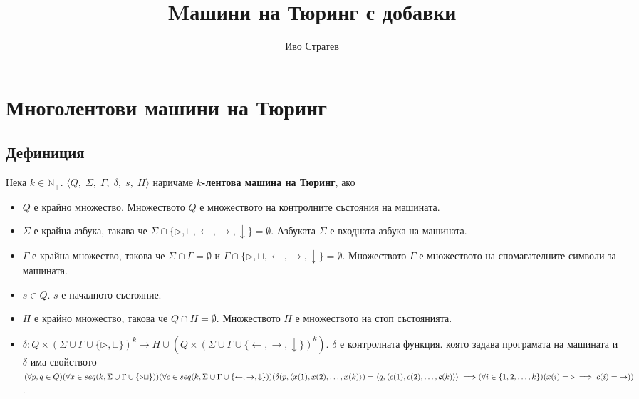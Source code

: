 \documentclass[14pt]{extarticle}
\title{Mашини на Тюринг с добавки}
\author{Иво Стратев}
\begin{document}
\maketitle

\section*{Многолентови машини на Тюринг}

\subsection*{Дефиниция}
Нека \(k \in \mathbb{N}_+\).
\(\langle Q,\; \Sigma,\; \Gamma,\; \delta,\; s,\; H \rangle\) наричаме \textbf{\(k\)-лентова машина на Тюринг}, ако

\begin{itemize}
    \item \(Q\) е крайно множество. Множеството \(Q\) е множеството на контролните състояния на машината.
    \item \(\Sigma\) е крайна азбука, такава че \(\Sigma \cap \{\triangleright, \sqcup, \leftarrow, \rightarrow, \downarrow\} = \emptyset\). Азбуката \(\Sigma\) е входната азбука на машината.
    \item \(\Gamma\) е крайна множество, такова че \(\Sigma \cap \Gamma = \emptyset\) и \(\Gamma \cap \{\triangleright, \sqcup, \leftarrow, \rightarrow, \downarrow\} = \emptyset\). Множеството \(\Gamma\) е множеството на спомагателните символи за машината.
    \item \(s \in Q\). \(s\) е началното състояние.
    \item \(H\) е крайно множество, такова че \(Q \cap H = \emptyset\). Множеството \(H\) е множеството на стоп състоянията.
    \item \(\delta : Q \times (\Sigma \cup \Gamma \cup \{ \triangleright, \sqcup \})^k \to H \cup (Q \times (\Sigma \cup \Gamma \cup \{\leftarrow, \rightarrow, \downarrow\})^k)\). \(\delta\) е контролната функция. която задава програмата на машината и \(\delta\) има свойството \\
    
    \((\forall p, q \in Q)(\forall x \in seq(k, \Sigma \cup \Gamma \cup \{\triangleright \sqcup\}))(\forall c \in seq(k, \Sigma \cup \Gamma \cup \{\leftarrow, \rightarrow, \downarrow\})) \\
    (\delta(p, \langle x(1), x(2), \dots, x(k) \rangle) = \langle q, \langle c(1), c(2), \dots, c(k) \rangle \rangle \implies \\ (\forall i \in \{1, 2, \dots, k\})(x(i) = \triangleright \implies c(i) = \;\rightarrow ))\).
\end{itemize}
\end{document}
